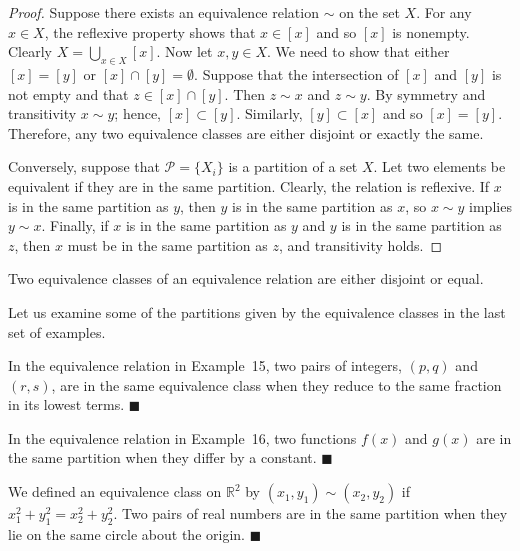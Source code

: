 \begin{proof}
Suppose there exists an equivalence relation $\sim$ on the set $X$.  For any $x \in X$, the reflexive property shows that $x \in [x]$ and so $[x]$ is nonempty.  Clearly $X = \bigcup_{x \in X} [x]$.  Now let $x, y \in X$. We need to show that either $[x] = [y]$ or $[x] \cap [y] = \emptyset$.  Suppose that the intersection of $[x]$ and $[y]$ is not empty and that $z \in [x] \cap [y]$. Then $z \sim x$ and $z \sim y$.  By symmetry and transitivity $x \sim y$; hence, $[x] \subset [y]$.  Similarly, $[y] \subset [x]$ and so $[x] = [y]$.  Therefore, any two equivalence classes are either disjoint or exactly the same.
 
Conversely, suppose that ${\mathcal P} = \{X_i\}$ is a partition of a set $X$.  Let two elements be equivalent if they are in the same partition.  Clearly, the relation is reflexive.  If $x$ is in the same partition as $y$, then $y$ is in the same partition as $x$, so $x \sim y$ implies $y \sim x$.  Finally, if $x$ is in the same partition as $y$ and $y$ is in the same partition as $z$, then $x$ must be in the same partition as $z$, and transitivity holds.
\end{proof}

\begin{corollary}\label{sets_theorem_6}
Two equivalence classes of an equivalence relation are either disjoint or equal.
\end{corollary}
 
Let us examine some of the partitions given by the equivalence classes in the last set of examples. 

\medskip
 
In the equivalence relation in Example~15, two pairs of integers, $(p,q)$ and $(r,s)$, are in the same equivalence class when they reduce to the same fraction in its lowest terms.  
\hspace{\fill} $\blacksquare$
 
\medskip
 
In the equivalence relation in Example~16, two functions $f(x)$ and $g(x)$ are in the same partition when they differ by a constant.  
\hspace{\fill} $\blacksquare$
 
\medskip

We defined an equivalence class on ${\mathbb R}^2$ by $(x_1, y_1 ) \sim (x_2, y_2)$ if $x_1^2 + y_1^2 = x_2^2 + y_2^2$.  Two pairs of real numbers are in the same partition when they lie on the same circle about the origin. 
\hspace{\fill} $\blacksquare$
 

